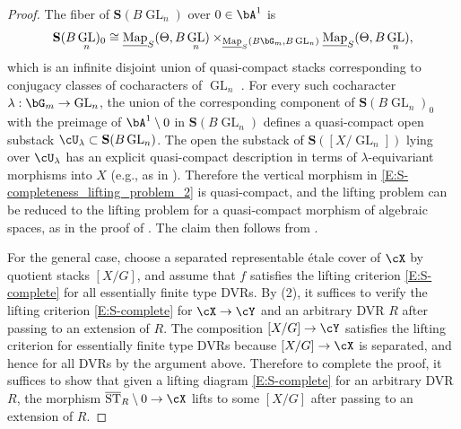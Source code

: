 \documentclass[a4paper]{amsart}
\numberwithin{equation}{section}
\theoremstyle{plain}
\theoremstyle{definition}
\DeclareMathOperator{\ST}{ST}
\DeclareMathOperator{\GL}{GL}
\newcommand{\uMap}{\underline{{\rm Map}}}
\def\oST{\overline{\ST}}
\begin{document}
\begin{proof}
The fiber of $\textbf{S}(B\GL_n)$ over $0 \in \bA^1$ is
\[
\textbf{S}(B\GL_n)_0 \cong \uMap_S(\Theta,B\GL_n) \times_{\uMap_S(B\bG_m,B\GL_n)} \uMap_S(\Theta, B\GL_n),
\]
which is an infinite disjoint union of quasi-compact stacks corresponding to conjugacy classes of cocharacters of $\GL_n$ \cite[Thm.~1.4.7]{hlinstability}. For every such cocharacter $\lambda : \bG_m \to \GL_n$, the union of the corresponding component of $\mathbf{S}(B\GL_n)_0$ with the preimage of $\bA^1 \setminus 0$ in $\mathbf{S}(B\GL_n)$ defines a quasi-compact open substack $\cU_\lambda \subset \mathbf{S}(B\GL_n)$. The open the substack of $\mathbf{S}([X/\GL_n])$ lying over $\cU_\lambda$ has an explicit quasi-compact description in terms of $\lambda$-equivariant morphisms into $X$ (e.g., as in \cite[Theorem 2.2.2]{drinfeld}). Therefore the vertical morphism in \eqref{E:S-completeness_lifting_problem_2} is quasi-compact, and the lifting problem can be reduced to the lifting problem for a quasi-compact morphism of algebraic spaces, as in the proof of . The claim then follows from .

For the general case, choose a separated representable \'etale cover of $\cX$ by quotient stacks $[X/G]$, and assume that $f$ satisfies the lifting criterion \eqref{E:S-complete} for all essentially finite type DVRs. By (2), it suffices to verify the lifting criterion \eqref{E:S-complete} for $\cX \to \cY$ and an arbitrary DVR $R$ after passing to an extension of $R$. The composition $[X/G] \to \cY$ satisfies the lifting criterion for essentially finite type DVRs because $[X/G] \to \cX$ is separated, and hence for all DVRs by the argument above. Therefore to complete the proof, it suffices to show that given a lifting diagram \eqref{E:S-complete} for an arbitrary DVR $R$, the morphism $\oST_R \setminus 0 \to \cX$ lifts to some $[X/G]$ after passing to an extension of $R$.


\end{proof}
\end{document}
